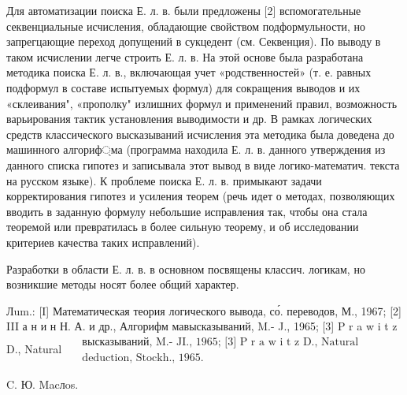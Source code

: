 \documentclass[10pt]{article}
\begin{document}
Для автоматизации поиска Е. л. в. были предложены [2] вспомогательные секвенциальные исчисления, обладающие свойством подформульности, но запрегцающие переход допущений в сукцедент (см. Секвенция). По выводу в таком исчислении легче строить Е. л. в. На этой основе была разработана методика поиска Е. л. в., включающая учет «родственностей» (т. е. равных подформул в составе испытуемых формул) для сокращения выводов и их «склеивания", «прополку" излишних формул и применений правил, возможность варьирования тактик установления выводимости и др. В рамках логических средств классического высказываний исчисления эта методика была доведена до машинного алгориф্ма (программа находила Е. л. в. данного утверждения из данного списка гипотез и записывала этот вывод в виде логико-математич. текста на русском языке). К проблеме поиска Е. л. в. примыкают задачи корректирования гипотез и усиления теорем (речь идет о методах, позволяющих вводить в заданную формулу небольшие исправления так, чтобы она стала теоремой или превратилась в более сильную теорему, и об исследовании критериев качества таких исправлений).



Разработки в области Е. л. в. в основном посвящены классич. логикам, но возникшие методы носят более общий характер.



Лum.: [I] Математическая теория логического вывода, со́. переводов, М., 1967; [2] III а н и н Н. А. и др., Алгорифм мавысказываний, M.- J., 1965; [3] P r a w i t z D., Natural $\begin{aligned} & \text { высказываний, M.- JI., 1965; [3] P r a w i t z D., Natural } \\ & \text { deduction, Stockh., 1965. }\end{aligned}$

C. Ю. Macлos.
\end{document}
